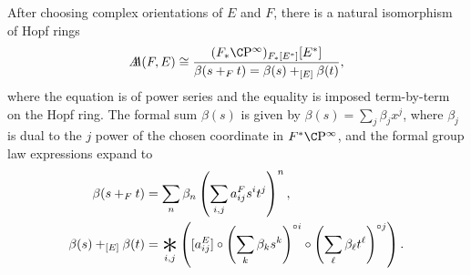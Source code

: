 \begin{lemma}\label{UnstableRWRelation}
After choosing complex orientations of $E$ and $F$, there is a natural isomorphism of Hopf rings \[\AA(F, E) \cong \frac{(F_* \CP^\infty)_{F_*[E^*]}[E^*]}{\beta(s +_F t) = \beta(s) +_{[E]} \beta(t)},\] where the equation is of power series and the equality is imposed term-by-term on the Hopf ring.  The formal sum $\beta(s)$ is given by $\beta(s) = \sum_j \beta_j x^j$, where $\beta_j$ is dual to the $j${\th} power of the chosen coordinate in $F^* \CP^\infty$, and the formal group law expressions expand to
\begin{align*}
\beta(s +_F t) & = \sum_n \beta_n \left(\sum_{i, j} a_{ij}^F s^i t^j \right)^n, \\
\beta(s) +_{[E]} \beta(t) & = \bigast_{i, j} \left([a_{ij}^E] \circ \left( \sum_k \beta_k s^k \right)^{\circ i} \circ \left( \sum_\ell \beta_\ell t^\ell \right)^{\circ j} \right).
\end{align*}
\end{lemma}
